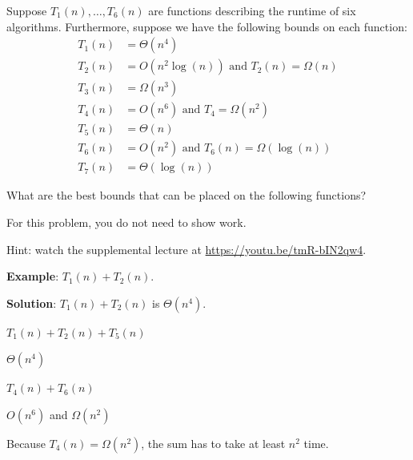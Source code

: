 \begin{prob}

    Suppose $T_1(n), \ldots, T_6(n)$ are functions
    describing the runtime of six algorithms. Furthermore, suppose we
    have the following bounds on each function:
    \begin{align*}
        T_1(n) &= \Theta(n^4)\\
        T_2(n) &= O(n^2 \log(n)) \text{ and } T_2(n) = \Omega(n)\\
        T_3(n) &= \Omega(n^3)\\
        T_4(n) &= O(n^6) \text{ and } T_4 = \Omega(n^2)\\
        T_5(n) &= \Theta(n)\\
        T_6(n) &= O(n^2) \text{ and } T_6(n) = \Omega(\log(n))\\
        T_7(n) &= \Theta(\log(n))
    \end{align*}

    What are the best bounds that can be placed on the following functions?
    
    For this problem, you do not need to show work.

    Hint: watch the supplemental lecture at \url{https://youtu.be/tmR-bIN2qw4}.

    \textbf{Example}: $T_1(n) + T_2(n)$.

    \textbf{Solution}: $T_1(n) + T_2(n)$ is $\Theta(n^4)$.


    \begin{subprobset}

        \begin{subprob}
            $T_1(n) + T_2(n) + T_5(n)$

            \begin{soln}
                $\Theta(n^4)$
            \end{soln}
        \end{subprob}

        \begin{subprob}
            $T_4(n) + T_6(n)$

            \begin{soln}
                $O(n^6)$ and $\Omega(n^2)$

                Because $T_4(n) = \Omega(n^2)$, the sum has to take at least $n^2$ time.
            \end{soln}
        \end{subprob}


\end{subprobset}
\end{prob}
